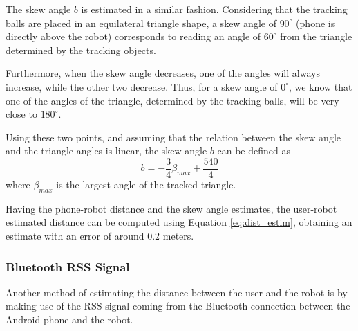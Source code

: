 \documentclass[journal]{IEEEtran}
\begin{document}
The skew angle $b$ is estimated in a similar fashion. Considering that the tracking balls are placed in an equilateral triangle shape, a skew angle of $90^{\circ}$ (phone is directly above the robot) corresponds to reading an angle of $60^{\circ}$ from the triangle determined by the tracking objects.

Furthermore, when the skew angle decreases, one of the angles will always increase, while the other two decrease. Thus, for a skew angle of $0^{\circ}$, we know that one of the angles of the triangle, determined by the tracking balls, will be very close to $180^{\circ}$.

Using these two points, and assuming that the relation between the skew angle and the triangle angles is linear, the skew angle $b$ can be defined as
\begin{equation}
b=-\frac{3}{4}\beta_{max}+\frac{540}{4}
\end{equation}
where $\beta_{max}$ is the largest angle of the tracked triangle.

Having the phone-robot distance and the skew angle estimates, the user-robot estimated distance can be computed using Equation \ref{eq:dist_estim}, obtaining an estimate with an error of around $0.2$ meters.

\subsubsection{Bluetooth RSS Signal}
Another method of estimating the distance between the user and the robot is by making use of the RSS signal coming from the Bluetooth connection between the Android phone and the robot.
\end{document}
